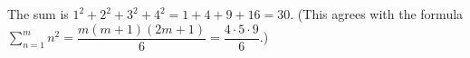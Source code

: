 The sum is $1^2+2^2+3^2+4^2=1+4+9+16=\boxed{30}$. (This agrees with the formula $\displaystyle\sum_{n=1}^{m}n^2=\dfrac{m(m+1)(2m+1)}{6}=\dfrac{4\cdot5\cdot9}{6}$.)
